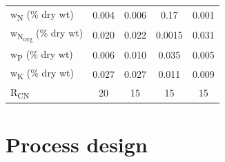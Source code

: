 \begin{refsection}[referencesCh7]
\begin{table}[h]
{\begin{tabular}{@{}lcccc@{}}
			w\textsubscript{N} (\% dry wt)    & 0.004                                                                               & 0.006                                                                                           & 0.17                                                                                      & 0.001                                                                                  \\
			w\textsubscript{N\textsubscript{org}} (\% dry wt) & 0.020                                                                               & 0.022                                                                                           & 0.0015                                                                                    & 0.031                                                                                  \\
			w\textsubscript{P} (\% dry wt)    & 0.006                                                                               & 0.010                                                                                           & 0.035                                                                                     & 0.005                                                                                  \\
			w\textsubscript{K} (\% dry wt)    & 0.027                                                                               & 0.027                                                                                           & 0.011                                                                                     & 0.009                                                                                  \\
			R\textsubscript{CN}               & 20                                                                                  & 15                                                                                              & 15                                                                                        & 15                                                                                     \\ \bottomrule
		\end{tabular}
	}
\end{table}


\section{Process design}\label{section:Sec3}

\end{refsection}
